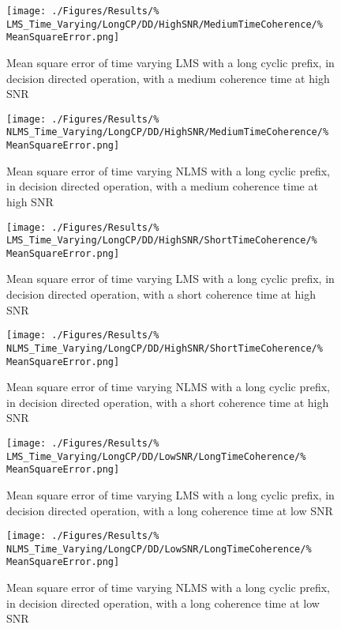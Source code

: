 \begin{figure}[ht]
	\centering
	\begin{minipage}{0.49\textwidth}
		\centering
		\texttt{[image: ./Figures/Results/\%
	LMS\_Time\_Varying/LongCP/DD/HighSNR/MediumTimeCoherence/\%
	MeanSquareError.png]}
		\captionsetup{width=0.75\linewidth}
		\caption{Mean square error of time varying LMS with a 
		long cyclic prefix, in decision directed operation, 
		with a medium coherence time at high SNR}
		\label{fig:Medium-High-Directed-Long}
	\end{minipage}
	\begin{minipage}{0.49\textwidth}
		\centering
		\texttt{[image: ./Figures/Results/\%
	NLMS\_Time\_Varying/LongCP/DD/HighSNR/MediumTimeCoherence/\%
	MeanSquareError.png]}
		\captionsetup{width=0.75\linewidth}
		\caption{Mean square error of time varying NLMS with 
		a long cyclic prefix, in decision directed operation, 
		with a medium coherence time at high SNR}
	\end{minipage}
\end{figure}

\begin{figure}[ht]
	\centering
	\begin{minipage}{0.49\textwidth}
		\centering
		\texttt{[image: ./Figures/Results/\%
	LMS\_Time\_Varying/LongCP/DD/HighSNR/ShortTimeCoherence/\%
	MeanSquareError.png]}
		\captionsetup{width=0.75\linewidth}
		\caption{Mean square error of time varying LMS with a 
		long cyclic prefix, in decision directed operation,
		with a short coherence time at high SNR}
	\end{minipage}
	\begin{minipage}{0.49\textwidth}
		\centering
		\texttt{[image: ./Figures/Results/\%
	NLMS\_Time\_Varying/LongCP/DD/HighSNR/ShortTimeCoherence/\%
	MeanSquareError.png]}
		\captionsetup{width=0.75\linewidth}
		\caption{Mean square error of time varying NLMS with 
		a long cyclic prefix, in decision directed operation,
		with a short coherence time at high SNR}
		\label{fig:NLMS-Short-High-Directed-Long}
	\end{minipage}
\end{figure}

\begin{figure}[ht]
	\begin{minipage}{0.49\textwidth}
		\texttt{[image: ./Figures/Results/\%
	LMS\_Time\_Varying/LongCP/DD/LowSNR/LongTimeCoherence/\%
	MeanSquareError.png]}
		\captionsetup{width=0.75\linewidth}
		\caption{Mean square error of time varying LMS with a 
		long cyclic prefix, in decision directed operation,
		with a long coherence time at low SNR}
	\end{minipage}
	\begin{minipage}{0.49\textwidth}
		\texttt{[image: ./Figures/Results/\%
	NLMS\_Time\_Varying/LongCP/DD/LowSNR/LongTimeCoherence/\%
	MeanSquareError.png]}
		\captionsetup{width=0.75\linewidth}
		\caption{Mean square error of time varying NLMS with 
		a long cyclic prefix, in decision directed operation,
		with a long coherence time at low SNR}
	\end{minipage}
\end{figure}

